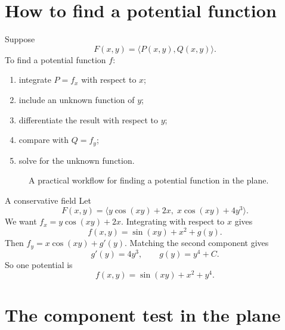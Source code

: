 \documentclass[11pt,oneside]{book}
\begin{document}
\section{How to find a potential function}

Suppose
\[
F(x,y)=\langle P(x,y),Q(x,y)\rangle.
\]
To find a potential function $f$:
\begin{enumerate}
  \item integrate $P=f_x$ with respect to $x$;
  \item include an unknown function of $y$;
  \item differentiate the result with respect to $y$;
  \item compare with $Q=f_y$;
  \item solve for the unknown function.
\end{enumerate}

\begin{figure}[H]
\centering
{}
\caption{A practical workflow for finding a potential function in the plane.}
\end{figure}

\begin{examplebox}{A conservative field}
Let
\[
F(x,y)=\langle y\cos(xy)+2x,\; x\cos(xy)+4y^3\rangle.
\]
We want $f_x=y\cos(xy)+2x$. Integrating with respect to $x$ gives
\[
f(x,y)=\sin(xy)+x^2+g(y).
\]
Then $f_y=x\cos(xy)+g'(y)$. Matching the second component gives
\[
g'(y)=4y^3,\qquad g(y)=y^4+C.
\]
So one potential is
\[
f(x,y)=\sin(xy)+x^2+y^4.
\]
\end{examplebox}

\section{The component test in the plane}
\end{document}
